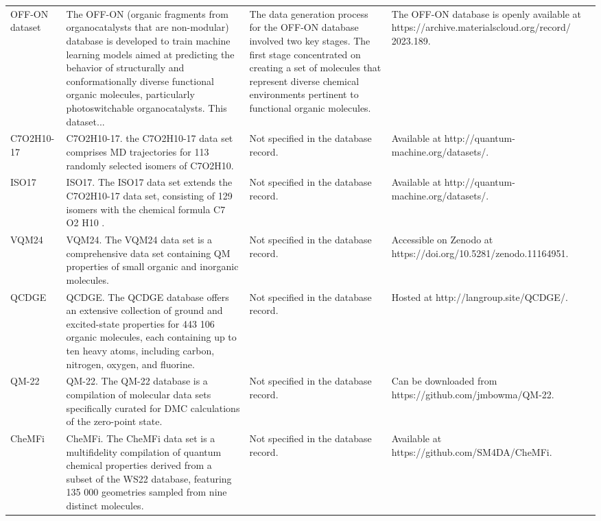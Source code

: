 \documentclass[12pt]{article}
\begin{document}
\begin{longtable}{p{}p{}p{}p{}}
OFF-ON dataset \cite{ds36-24} & The OFF-ON (organic fragments from organocatalysts that are non-modular) database is developed to train machine learning models aimed at predicting the behavior of structurally and conformationally diverse functional organic molecules, particularly photoswitchable organocatalysts. This dataset... & The data generation process for the OFF-ON database involved two key stages. The first stage concentrated on creating a set of molecules that represent diverse chemical environments pertinent to functional organic molecules. & The OFF-ON database is openly available at https://archive.materialscloud.org/record/ 2023.189. \cite{ds36-24,ds36-172} \\
C7O2H10-17 \cite{ds37-10} & C7O2H10-17. the C7O2H10-17 data set comprises MD trajectories for 113 randomly selected isomers of C7O2H10. & Not specified in the database record. & Available at http://quantum-machine.org/datasets/. \cite{ds37-10} \\
ISO17 \cite{ds38-17} & ISO17. The ISO17 data set extends the C7O2H10-17 data set, consisting of 129 isomers with the chemical formula C7 O2 H10 . & Not specified in the database record. & Available at http://quantum-machine.org/datasets/. \cite{ds38-17} \\
VQM24 \cite{ds39-49} & VQM24. The VQM24 data set is a comprehensive data set containing QM properties of small organic and inorganic molecules. & Not specified in the database record. & Accessible on Zenodo at https://doi.org/10.5281/zenodo.11164951. \cite{ds39-97,ds39-186} \\
QCDGE \cite{ds40-30} & QCDGE. The QCDGE database offers an extensive collection of ground and excited-state properties for 443 106 organic molecules, each containing up to ten heavy atoms, including carbon, nitrogen, oxygen, and fluorine. & Not specified in the database record. & Hosted at http://langroup.site/QCDGE/. \cite{ds40-30} \\
QM-22 \cite{ds41-40} & QM-22. The QM-22 database is a compilation of molecular data sets specifically curated for DMC calculations of the zero-point state. & Not specified in the database record. & Can be downloaded from https://github.com/jmbowma/QM-22. \cite{ds41-188} \\
CheMFi \cite{ds42-11} & CheMFi. The CheMFi data set is a multifidelity compilation of quantum chemical properties derived from a subset of the WS22 database, featuring 135 000 geometries sampled from nine distinct molecules. & Not specified in the database record. & Available at https://github.com/SM4DA/CheMFi. \cite{ds42-189} \\

\end{longtable}
\end{document}
